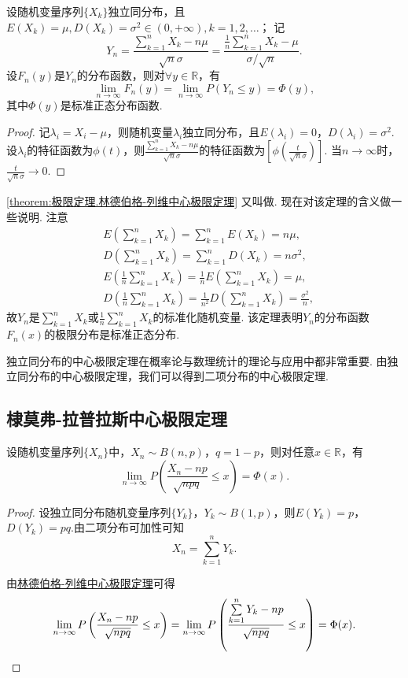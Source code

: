 \begin{theorem}\label{theorem:极限定理.林德伯格-列维中心极限定理}
设随机变量序列\(\{X_k\}\)独立同分布，且\(E(X_k)=\mu, D(X_k)=\sigma^2\in(0,+\infty), k=1,2,\dotsc\)；
记\[
Y_n = \frac{\sum\limits_{k=1}^n X_k - n\mu}{\sqrt{n} \sigma}
= \frac{ \frac{1}{n} \sum\limits_{k=1}^n X_k - \mu}{\sigma / \sqrt{n}}.
\]设\(F_n(y)\)是\(Y_n\)的分布函数，则对\(\forall y \in \mathbb{R}\)，有\[
\lim\limits_{n\to\infty} F_n(y)
= \lim\limits_{n\to\infty} P(Y_n \leq y) = \Phi(y),
\]其中\(\Phi(y)\)是标准正态分布函数.
\begin{proof}
记\(\lambda_i = X_i-\mu\)，则随机变量\(\lambda_i\)独立同分布，且\(E(\lambda_i)=0\)，\(D(\lambda_i)=\sigma^2\).
设\(\lambda_i\)的特征函数为\(\phi(t)\)，则\(\frac{\sum\limits_{k=1}^n X_k - n\mu}{\sqrt{n} \sigma}\)的特征函数为\(\left[\phi\left(\frac{t}{\sqrt{n}\sigma}\right)\right]\).
当\(n\to\infty\)时，\(\frac{t}{\sqrt{n}\sigma}\to0\).
\end{proof}
\end{theorem}

\cref{theorem:极限定理.林德伯格-列维中心极限定理} 又叫做.
现在对该定理的含义做一些说明.
注意\begin{align*}
&E\left(\sum\limits_{k=1}^n X_k\right) = \sum\limits_{k=1}^n E(X_k) = n\mu, \\
&D\left(\sum\limits_{k=1}^n X_k\right) = \sum\limits_{k=1}^n D(X_k) = n\sigma^2, \\
&E\left(\frac{1}{n} \sum\limits_{k=1}^n X_k\right)
= \frac{1}{n} E\left(\sum\limits_{k=1}^n X_k\right)
= \mu, \\
&D\left(\frac{1}{n} \sum\limits_{k=1}^n X_k\right)
= \frac{1}{n^2} D\left(\sum\limits_{k=1}^n X_k\right)
= \frac{\sigma^2}{n},
\end{align*}
故\(Y_n\)是\(\sum\limits_{k=1}^n X_k\)或\(\frac{1}{n} \sum\limits_{k=1}^n X_k\)的标准化随机变量.
该定理表明\(Y_n\)的分布函数\(F_n(x)\)的极限分布是标准正态分布.

独立同分布的中心极限定理在概率论与数理统计的理论与应用中都非常重要.
由独立同分布的中心极限定理，我们可以得到二项分布的中心极限定理.
\subsection{棣莫弗-拉普拉斯中心极限定理}
\begin{theorem}\label{theorem:极限定理.棣莫弗-拉普拉斯中心极限定理}
设随机变量序列\(\{X_n\}\)中，\(X_n \sim B(n,p)\)，\(q = 1-p\)，则对任意\(x \in \mathbb{R}\)，有\[
\lim\limits_{n\to\infty} P\left( \frac{X_n - np}{\sqrt{npq}} \leq x \right) = \Phi(x).
\]
\begin{proof}
设独立同分布随机变量序列\(\{Y_k\}\)，\(Y_k \sim B(1,p)\)，则\(E(Y_k)=p\)，\(D(Y_k)=pq\).由二项分布可加性可知\[
X_n = \sum\limits_{k=1}^n{Y_k}.
\]

由\hyperref[theorem:极限定理.林德伯格-列维中心极限定理]{林德伯格-列维中心极限定理}可得\[
\lim\limits_{n\to\infty} P\left(\frac{X_n-np}{\sqrt{npq}} \leq x\right)
= \lim\limits_{n\to\infty} P\left(\frac{\sum\limits_{k=1}^n{Y_k}-np}{\sqrt{npq}} \leq x\right)
= \Phi(x).
\qedhere
\]
\end{proof}
\end{theorem}

